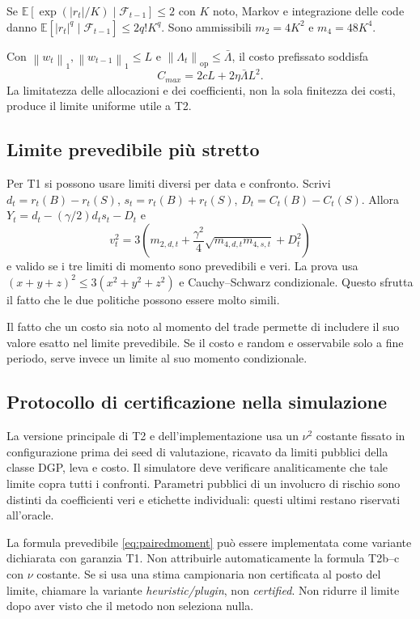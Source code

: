 \documentclass[11pt,a4paper]{article}
\theoremstyle{definition}\newtheorem{definition}[theorem]{Definizione}
\theoremstyle{remark}\newtheorem{remark}[theorem]{Osservazione}
\newcommand{\E}{\mathbb E}\newcommand{\PP}{\mathbb P}\newcommand{\R}{\mathbb R}
\newcommand{\F}{\mathcal F}\newcommand{\W}{\mathcal W}\newcommand{\supp}{\operatorname{supp}}
\newcommand{\op}{\mathrm{op}}\newcommand{\ind}{\mathbf 1}\newcommand{\pos}[1]{\left[#1\right]_+}
\newcommand{\norm}[1]{\left\lVert#1\right\rVert}\newcommand{\abs}[1]{\left|#1\right|}
\begin{document}
Se $\E[\exp(|r_t|/K)\mid\F_{t-1}]\le2$ con $K$ noto, Markov e integrazione delle code danno $\E[|r_t|^q\mid\F_{t-1}]\le2q!K^q$. Sono ammissibili $m_2=4K^2$ e $m_4=48K^4$.

Con $\norm{w_t}_1,\norm{w_{t-1}}_1\le L$ e $\norm{\Lambda_t}_\op\le\bar\Lambda$, il costo prefissato soddisfa
\begin{equation}
 C_{max}=2cL+2\eta\bar\Lambda L^2.
\end{equation}
La limitatezza delle allocazioni e dei coefficienti, non la sola finitezza dei costi, produce il limite uniforme utile a T2.

\subsection{Limite prevedibile più stretto}
Per T1 si possono usare limiti diversi per data e confronto. Scrivi $d_t=r_t(B)-r_t(S)$, $s_t=r_t(B)+r_t(S)$, $D_t=C_t(B)-C_t(S)$. Allora $Y_t=d_t-(\gamma/2)d_ts_t-D_t$ e
\begin{equation}
 v_t^2=3\left(m_{2,d,t}+\frac{\gamma^2}{4}\sqrt{m_{4,d,t}m_{4,s,t}}+D_t^2\right)\label{eq:pairedmoment}
\end{equation}
e valido se i tre limiti di momento sono prevedibili e veri. La prova usa $(x+y+z)^2\le3(x^2+y^2+z^2)$ e Cauchy--Schwarz condizionale. Questo sfrutta il fatto che le due politiche possono essere molto simili.

Il fatto che un costo sia noto al momento del trade permette di includere il suo valore esatto nel limite prevedibile. Se il costo e random e osservabile solo a fine periodo, serve invece un limite al suo momento condizionale.

\subsection{Protocollo di certificazione nella simulazione}
La versione principale di T2 e dell'implementazione usa un $\nu^2$ costante fissato in configurazione prima dei seed di valutazione, ricavato da limiti pubblici della classe DGP, leva e costo. Il simulatore deve verificare analiticamente che tale limite copra tutti i confronti. Parametri pubblici di un involucro di rischio sono distinti da coefficienti veri e etichette individuali: questi ultimi restano riservati all'oracle.

La formula prevedibile \eqref{eq:pairedmoment} può essere implementata come variante dichiarata con garanzia T1. Non attribuirle automaticamente la formula T2b--c con $\nu$ costante. Se si usa una stima campionaria non certificata al posto del limite, chiamare la variante \emph{heuristic/plugin}, non \emph{certified}. Non ridurre il limite dopo aver visto che il metodo non seleziona nulla.
\end{document}
